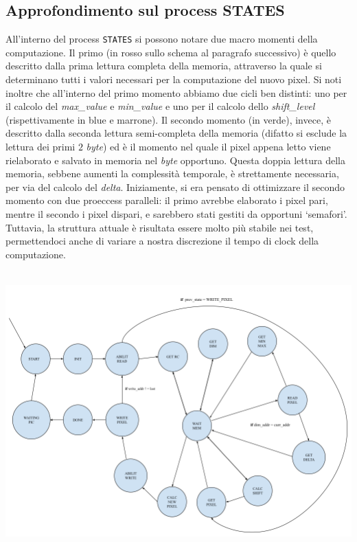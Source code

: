 \documentclass[11pt, a4paper]{article}
\begin{document}
\subsection{Approfondimento sul process STATES}
All'interno del process \texttt{STATES} si possono notare due macro momenti della computazione. Il primo (in rosso sullo schema al paragrafo successivo) è quello descritto dalla prima lettura completa della memoria, attraverso la quale si determinano tutti i valori necessari per la computazione del nuovo pixel. Si noti inoltre che all'interno del primo momento abbiamo due cicli ben distinti: uno per il calcolo del \textit{max\_value} e \textit{min\_value} e uno per il calcolo dello \textit{shift\_level} (rispettivamente in blue e marrone). Il secondo momento (in verde), invece, è descritto dalla seconda lettura semi-completa della memoria (difatto si esclude la lettura dei primi $2$ \textit{byte}) ed è il momento nel quale il pixel appena letto viene rielaborato e salvato in memoria nel \textit{byte} opportuno. Questa doppia lettura della memoria, sebbene aumenti la complessità temporale, è strettamente necessaria, per via del calcolo del \textit{delta}. Iniziamente, si era pensato di ottimizzare il secondo momento con due proeccess paralleli: il primo avrebbe elaborato i pixel pari, mentre il secondo i pixel dispari, e sarebbero stati gestiti da opportuni `semafori'. Tuttavia, la struttura attuale è risultata essere molto più stabile nei test, permettendoci anche di variare a nostra discrezione il tempo di clock della computazione.
\includegraphics[width=16cm, height=11.5cm]{FSM.png}
\end{document}
